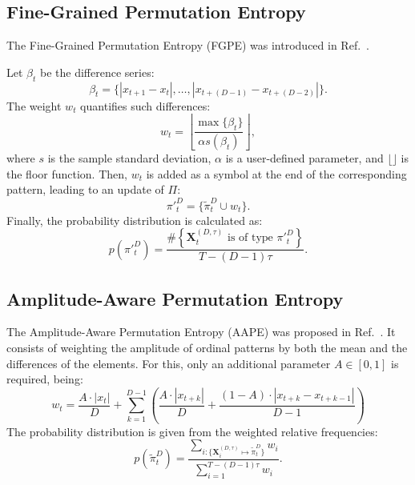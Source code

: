 \documentclass[journal]{IEEEtran}
\begin{document}
	\subsection{Fine-Grained Permutation Entropy}\label{FGPE}
	
	The Fine-Grained Permutation Entropy (FGPE) was introduced in Ref.~\cite{xiao2009fine}.
	
	Let $\beta_t$ be the difference series:
	\begin{equation}
	\beta_t = \big\{|x_{t+1} - x_t|, \dots, |x_{t+(D-1)} - x_{t+(D-2)}|\big\}.
	\end{equation}
	The weight $w_t$ quantifies such differences:
	\begin{equation}
	w_t = \left \lfloor \frac{\max\{\beta_t\}}{\alpha s(\beta_t) } \right \rfloor,
	\end{equation}
	where $s$ is the sample standard deviation,
	$\alpha$ is a user-defined parameter, 
	and $\lfloor \rfloor$ is the floor function.
	Then, $w_t$ is added as a symbol at the end of the corresponding pattern, leading to an update of $\Pi$:
	\begin{equation}
	\pi{'}_t^D = \{ \widetilde \pi_t^D \cup w_t\}.
	\end{equation} 
	Finally, the probability distribution is calculated as:
	\begin{equation}
	p(\pi{'}_t^D) = \frac{\#\left \{\mathbf{X}_t^{(D,\tau)} \text{ is of type } \pi{'}_t^D\right \}}{T- (D-1)\tau}.
	\end{equation}
	
	\subsection{Amplitude-Aware Permutation Entropy}\label{AAPE}
	
	The Amplitude-Aware Permutation Entropy (AAPE) was proposed in Ref.~\cite{azami2016amplitude}.
	It consists of weighting the amplitude of ordinal patterns by both the mean and the differences of the elements.
	For this, only an additional parameter $ A \in [0, 1]$ is required, being:
	\begin{equation}
	w_t = \frac{A \cdot |x_t|}{D} + \sum_{k = 1}^{D - 1} \left(\frac{A \cdot |x_{t + k}|}{D} + \frac{(1 - A) \cdot |x_{t+k} - x_{t+k-1}|}{D - 1}\right)
	\end{equation}
	The probability distribution is given from the weighted relative frequencies:
	\begin{equation}
	p(\widetilde \pi_t^D) = \frac{\sum_{i : \{\mathbf{X}^{(D,\tau)}_i \mapsto \widetilde\pi^D_t\}} w_{i}}{\sum_{i = 1}^{T-(D-1)\tau} w_{i}}.
	\end{equation}
	
\end{document}
